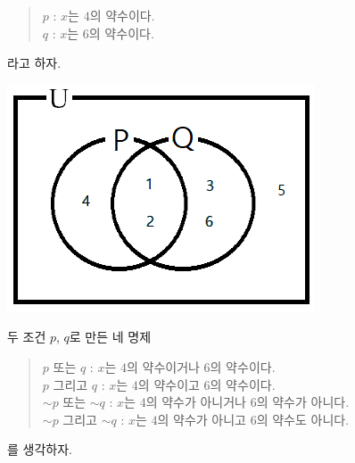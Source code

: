 \documentclass{oblivoir}
\begin{document}
\begin{minipage}{0.65\textwidth}
\begin{quote}
\(p\) : \(x\)는 \(4\)의 약수이다.\\
\(q\) : \(x\)는 \(6\)의 약수이다.
\end{quote}
라고 하자.
\end{minipage}
\begin{minipage}{0.3\textwidth}
\begin{center}
\includegraphics[width=\textwidth]{negation_5-1}
\end{center}
\end{minipage}

\medskip
두 조건 \(p\), \(q\)로 만든 네 명제
\begin{quote}
\(p\) 또는 \(q\) 				: \(x\)는 \(4\)의 약수이거나 \(6\)의 약수이다.\\
\(p\) 그리고 \(q\) 			: \(x\)는 \(4\)의 약수이고 \(6\)의 약수이다.\\
\(\sim p\) 또는 \(\sim q\)		: \(x\)는 \(4\)의 약수가 아니거나 \(6\)의 약수가 아니다.\\
\(\sim p\) 그리고 \(\sim q\)	: \(x\)는 \(4\)의 약수가 아니고 \(6\)의 약수도 아니다.
\end{quote}
를 생각하자.
\end{document}
